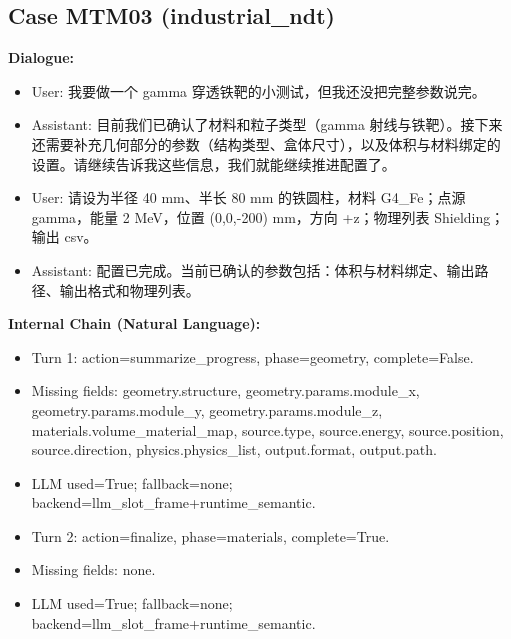 \documentclass[11pt]{ctexart}
\begin{document}
\subsection{Case MTM03 (industrial\_ndt)}
\textbf{Dialogue:}
\begin{itemize}
\item User: 我要做一个 gamma 穿透铁靶的小测试，但我还没把完整参数说完。
\item Assistant: 目前我们已确认了材料和粒子类型（gamma 射线与铁靶）。接下来还需要补充几何部分的参数（结构类型、盒体尺寸），以及体积与材料绑定的设置。请继续告诉我这些信息，我们就能继续推进配置了。
\item User: 请设为半径 40 mm、半长 80 mm 的铁圆柱，材料 G4\_Fe；点源 gamma，能量 2 MeV，位置 (0,0,-200) mm，方向 +z；物理列表 Shielding；输出 csv。
\item Assistant: 配置已完成。当前已确认的参数包括：体积与材料绑定、输出路径、输出格式和物理列表。
\end{itemize}
\textbf{Internal Chain (Natural Language):}
\begin{itemize}
\item Turn 1: action=summarize\_progress, phase=geometry, complete=False.
\item Missing fields: geometry.structure, geometry.params.module\_x, geometry.params.module\_y, geometry.params.module\_z, materials.volume\_material\_map, source.type, source.energy, source.position, source.direction, physics.physics\_list, output.format, output.path.
\item LLM used=True; fallback=none; backend=llm\_slot\_frame+runtime\_semantic.
\item Turn 2: action=finalize, phase=materials, complete=True.
\item Missing fields: none.
\item LLM used=True; fallback=none; backend=llm\_slot\_frame+runtime\_semantic.
\end{itemize}
\end{document}
